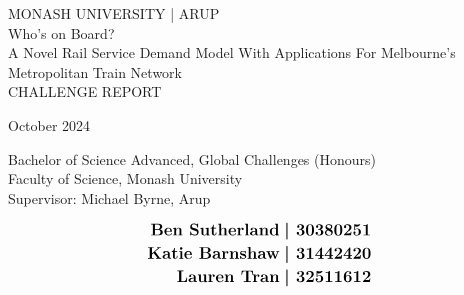 \begin{titlingpage}
    \textheight
    \vspace*{\drop}
    \centering
    {\LARGE MONASH UNIVERSITY | ARUP}\\[2\baselineskip]
    {
        \LARGE\sffamily 
        Who's on Board?\\A Novel Rail Service Demand Model With Applications For Melbourne's Metropolitan Train Network
    }\\
    \vspace{\drop}
    {\LARGE CHALLENGE REPORT}\par
    \vspace{\drop}
    {
        \Large October 2024 \\
        \par
        \large Bachelor of Science Advanced, Global Challenges (Honours) \\
        \large Faculty of Science, Monash University \\
        \large Supervisor: Michael Byrne, Arup \\
    }\par
    \vfill
    \begin{align*}
    \text{\large\bfseries Ben Sutherland} &\text{ \large\bfseries | 30380251}\\
    \text{\large\bfseries Katie Barnshaw} &\text{ \large\bfseries | 31442420}\\
    \text{\large\bfseries Lauren Tran} &\text{ \large\bfseries | 32511612}\\
    \end{align*}
\end{titlingpage}
